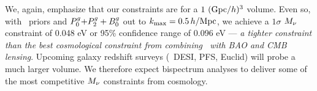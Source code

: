 We, again, emphasize that our constraints are for a $1~({\rm Gpc}/h)^3$ volume. 
Even so, with \planck~priors and $P^g_0{+}P^g_2+B^g_0$ out to $k_{\rm max} = 0.5\,h/\mathrm{Mpc}$, we
achieve a $1\sigma$ $M_\nu$ constraint of 0.048 eV or 95\% confidence range of
0.096 eV --- {\em a tighter constraint than the best cosmological constraint 
from combining \planck~with BAO and CMB lensing}. Upcoming galaxy redshift 
surveys (\eg~DESI, PFS, Euclid) will probe a much larger volume. We therefore 
expect bispectrum analyses to deliver some of the most competitive $M_\nu$ 
constraints from cosmology.





